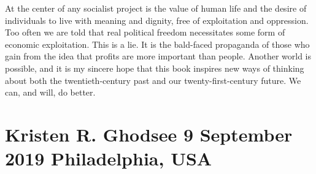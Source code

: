  \par 
At the center of any socialist project is the value of human life and the desire of individuals to live with meaning and dignity, free of exploitation and oppression. Too often we are told that real political freedom necessitates some form of economic exploitation. This is a lie. It is the bald-faced propaganda of those who gain from the idea that profits are more important than people. Another world is possible, and it is my sincere hope that this book inspires new ways of thinking about both the twentieth-century past and our twenty-first-century future. We can, and will, do better.
 \par 
\section{Kristen R. Ghodsee 9 September 2019 Philadelphia, USA}